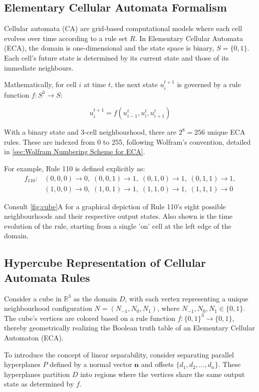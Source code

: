 \subsection*{Elementary Cellular Automata Formalism}
Cellular automata (CA) are grid-based computational models where each cell evolves over time according to a rule set \( R \). In Elementary Cellular Automata (ECA), the domain is one-dimensional and the state space is binary, \( S = \{0, 1\} \). Each cell's future state is determined by its current state and those of its immediate neighbours.

Mathematically, for cell \( i \) at time \( t \), the next state \( u_i^{t+1} \) is governed by a rule function \( f: S^3 \to S \):

\[
u_i^{t+1} = f(u_{i-1}^t, u_i^t, u_{i+1}^t)
\]

With a binary state and 3-cell neighbourhood, there are \( 2^8 = 256 \) unique ECA rules. These are indexed from 0 to 255, following Wolfram's convention, detailed in \autoref*{sec:Wolfram Numbering Scheme for ECA}.

For example, Rule 110 is defined explicitly as:
\[
\begin{array}{ll}
f_{\text{110}}: & (0,0,0) \to 0, \; (0,0,1) \to 1, \; (0,1,0) \to 1, \; (0,1,1) \to 1, \\
& (1,0,0) \to 0, \; (1,0,1) \to 1, \; (1,1,0) \to 1, \; (1,1,1) \to 0
\end{array}
\]

Consult \autoref{fig:cube}A for a graphical depiction of Rule 110's eight possible neighbourhoods and their respective output states. Also shown is the time evolution of the rule, starting from a single 'on' cell at the left edge of the domain.

\subsection*{Hypercube Representation of Cellular Automata Rules}
Consider a cube in \( \mathbb{R}^3 \) as the domain \( D \), with each vertex representing a unique neighbourhood configuration \( N = (N_{-1}, N_0, N_1) \), where \( N_{-1}, N_0, N_1 \in \{0, 1\} \). The cube's vertices are colored based on a rule function \( f: \{0, 1\}^3 \to \{0, 1\} \), thereby geometrically realizing the Boolean truth table of an Elementary Cellular Automaton (ECA).

To introduce the concept of linear separability, consider separating parallel hyperplanes \( P \) defined by a normal vector \( \mathbf{n} \) and offsets \( \{d_1, d_2, \ldots, d_n\} \). These hyperplanes partition \( D \) into regions where the vertices share the same output state as determined by \( f \).

